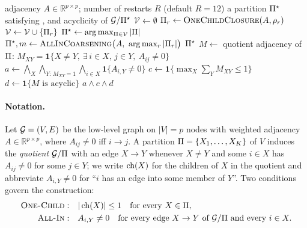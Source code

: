 \begin{algorithm}[t]
\caption{\textsc{OCC-AC} -- One-Child Closure with \Allin{} Coarsening}
\label{alg:occac}
\begin{algorithmic}[1]
\Require adjacency $A \in \mathbb{R}^{p\times p}$; number of restarts $R$ (default $R = 12$)
\Ensure a partition $\Pi^\star$ satisfying \Allin{}, \Onechild{} and acyclicity of $\mathcal{G} / \Pi^\star$
\State $\mathcal{V} \gets \emptyset$ 
  \State $\Pi_r \gets \textsc{OneChildClosure}(A, \rho_r)$
   
    \State $\mathcal{V} \gets \mathcal{V} \cup \{\Pi_r\}$
  \EndIf
\EndFor
{}
  \State $\Pi^\star \gets \arg\max_{\Pi \in \mathcal{V}} |\Pi|$ 
\Else
  \State $\Pi^\star, m \gets \textsc{AllInCoarsening}\bigl(A,\ \arg\max_{r} |\Pi_r|\bigr)$
\EndIf
\State \Return $\Pi^\star$
\Statex
{}
  \State $M \gets$ quotient adjacency of $\Pi$: $M_{XY} = \mathbf{1}\{X \neq Y,\ \exists\, i \in X,\, j \in Y,\ A_{ij} \neq 0\}$
  \State $a \gets \bigwedge_{X}\bigwedge_{Y:\, M_{XY}=1}\bigwedge_{i \in X} \mathbf{1}\{A_{i,Y} \neq 0\}$
  \Comment{\Allin{}}
  \State $c \gets \mathbf{1}\{\max_X \sum_Y M_{XY} \le 1\}$ \Comment{\Onechild{}}
  \State $d \gets \mathbf{1}\{M \text{ is acyclic}\}$
  \State \Return $a \wedge c \wedge d$
\EndProcedure
\end{algorithmic}
\end{algorithm}

\paragraph{Notation.}
Let $\mathcal{G} = (V, E)$ be the low-level graph on $|V| = p$ nodes with weighted adjacency
$A \in \mathbb{R}^{p \times p}$, where $A_{ij} \neq 0$ iff $i \to j$.
A partition $\Pi = \{X_1, \dots, X_K\}$ of $V$ induces the \emph{quotient}
$\mathcal{G} / \Pi$ with an edge $X \to Y$ whenever $X \neq Y$ and some $i \in X$ has
$A_{ij} \neq 0$ for some $j \in Y$; we write $\operatorname{ch}(X)$ for the children of $X$ in the
quotient and abbreviate $A_{i,Y} \neq 0$ for ``$i$ has an edge into some member of $Y$''.
Two conditions govern the construction:
\begin{align}
  \textsc{One-Child}: &\quad |\operatorname{ch}(X)| \le 1 \quad \text{for every } X \in \Pi,
  \label{eq:onechild}\\
  \textsc{All-In}:    &\quad A_{i,Y} \neq 0 \quad \text{for every edge } X \to Y \text{ of } \mathcal{G} / \Pi \text{ and every } i \in X.
  \label{eq:allin}
\end{align}

